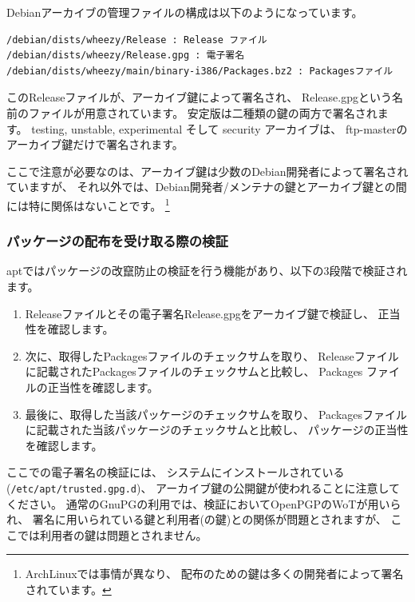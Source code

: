 \documentclass[mingoth,a4paper,twoside]{jsarticle}
\begin{document}
Debianアーカイブの管理ファイルの構成は以下のようになっています。

\begin{center}
\begin{Verbatim}[frame=single]
/debian/dists/wheezy/Release : Release ファイル
/debian/dists/wheezy/Release.gpg : 電子署名
/debian/dists/wheezy/main/binary-i386/Packages.bz2 : Packagesファイル
\end{Verbatim}
\end{center}

このReleaseファイルが、アーカイブ鍵によって署名され、
Release.gpgという名前のファイルが用意されています。
安定版は二種類の鍵の両方で署名されます。
testing, unstable, experimental そして security アーカイブは、
ftp-masterのアーカイブ鍵だけで署名されます。

ここで注意が必要なのは、アーカイブ鍵は少数のDebian開発者によって署名されていますが、
それ以外では、Debian開発者/メンテナの鍵とアーカイブ鍵との間には特に関係はないことです。
\footnote{ArchLinuxでは事情が異なり、
配布のための鍵は多くの開発者によって署名されています\cite{archlinux}。}


\subsubsection{パッケージの配布を受け取る際の検証}
aptではパッケージの改竄防止の検証を行う機能があり、以下の3段階で検証されます。

\begin{enumerate}
\item Releaseファイルとその電子署名Release.gpgをアーカイブ鍵で検証し、
      正当性を確認します。
\item 次に、取得したPackagesファイルのチェックサムを取り、
      Releaseファイルに記載されたPackagesファイルのチェックサムと比較し、
      Packages ファイルの正当性を確認します。
\item 最後に、取得した当該パッケージのチェックサムを取り、
      Packagesファイルに記載された当該パッケージのチェックサムと比較し、
      パッケージの正当性を確認します。
\end{enumerate}

ここでの電子署名の検証には、
システムにインストールされている(\verb|/etc/apt/trusted.gpg.d|)、
アーカイブ鍵の公開鍵が使われることに注意してください。
通常のGnuPGの利用では、検証においてOpenPGPのWoTが用いられ、
署名に用いられている鍵と利用者(の鍵)との関係が問題とされますが、
ここでは利用者の鍵は問題とされません。
\end{document}
